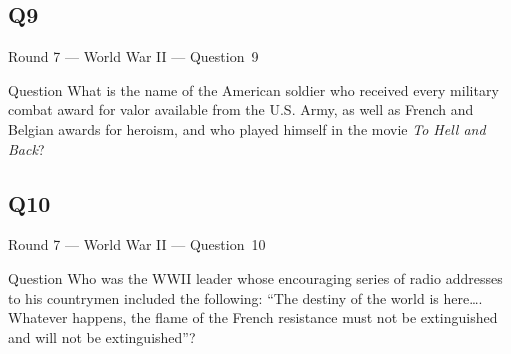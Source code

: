 \documentclass[11pt]{beamer}
\begin{document}
\subsection*{Q9}
\begin{frame}[t]{Round 7 --- World War II --- \mbox{Question 9}}
\vspace{-0.5em}
\begin{block}{Question}
What is the name of the American soldier who received every military combat award for valor available from the U.S. Army, as well as French and Belgian awards for heroism, and who played himself in the movie \emph{To Hell and Back}?
\end{block}
\end{frame}
\subsection*{Q10}
\begin{frame}[t]{Round 7 --- World War II --- \mbox{Question 10}}
\vspace{-0.5em}
\begin{block}{Question}
Who was the WWII leader whose encouraging series of radio addresses to his countrymen included the following:  ``The destiny of the world is here\dots{}. Whatever happens, the flame of the French resistance must not be extinguished and will not be extinguished''?
\end{block}
\end{frame}
\end{document}
